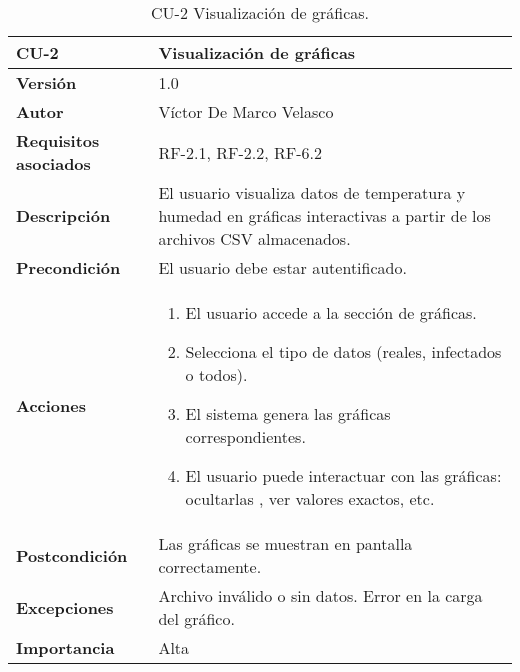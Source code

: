 \begin{table}[p]
	\centering
	\begin{tabularx}{\linewidth}{ p{} p{} }
		\toprule
		\textbf{CU-2}    & Visualización de gráficas \\
		\toprule
		\textbf{Versión}              & 1.0 \\
		\textbf{Autor}                & Víctor De Marco Velasco \\
		\textbf{Requisitos asociados} & RF-2.1, RF-2.2, RF-6.2 \\
		\textbf{Descripción}          & El usuario visualiza datos de temperatura y humedad en gráficas interactivas a partir de los archivos CSV almacenados. \\
		\textbf{Precondición}         & El usuario debe estar autentificado. \\
		\textbf{Acciones}             &
		\begin{enumerate}
			\item El usuario accede a la sección de gráficas.
			\item Selecciona el tipo de datos (reales, infectados o todos).
			\item El sistema genera las gráficas correspondientes.
			\item El usuario puede interactuar con las gráficas: ocultarlas , ver valores exactos, etc.
		\end{enumerate}\\
		\textbf{Postcondición}        & Las gráficas se muestran en pantalla correctamente. \\
		\textbf{Excepciones}          & Archivo inválido o sin datos. Error en la carga del gráfico. \\
		\textbf{Importancia}          & Alta \\
		\bottomrule
	\end{tabularx}
	\caption{CU-2 Visualización de gráficas.}
\end{table}

